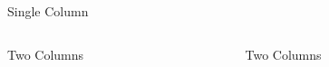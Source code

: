 \documentclass{beamer}
\begin{document}
 
  \begin{frame} 
    \begin{block}{Single Column} \vspace{4em} \end{block} 
    \begin{columns}[onlytextwidth, T]
      \begin{column}{.45\textwidth} 
        \begin{block}{Two Columns} \vspace{4em} \end{block} 
      \end{column} 
      \begin{column}{.45\textwidth} 
        \begin{block}{Two Columns} \vspace{4em} \end{block} 
      \end{column} 
    \end{columns} 
  \end{frame} 
\end{document}
